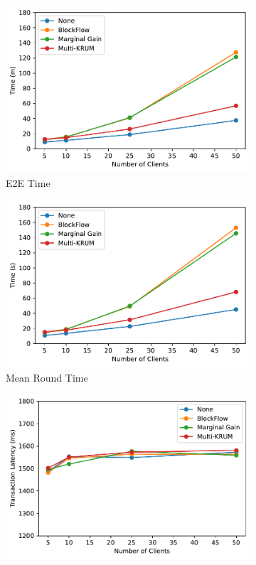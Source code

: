 \begin{figure}[!ht]
    \centering
    \begin{subfigure}[b]{0.49\textwidth}
        \centering
        \includegraphics[width=\textwidth]{graphics/clients/e2e.pdf}
        \caption{E2E Time}
    \end{subfigure}
    \hfill
    \begin{subfigure}[b]{0.49\textwidth}
        \centering
        \includegraphics[width=\textwidth]{graphics/clients/round.pdf}
        \caption{Mean Round Time}
    \end{subfigure}
    \hfill
    \begin{subfigure}[b]{0.49\textwidth}
        \centering
        \includegraphics[width=\textwidth]{graphics/clients/tx_latency.pdf}

\end{subfigure}
\end{figure}
